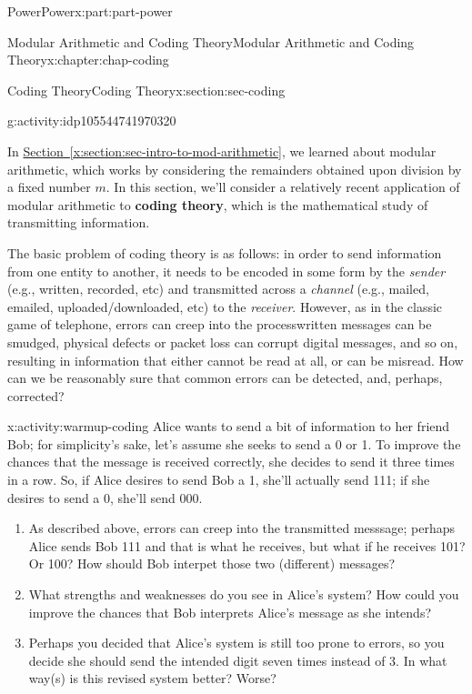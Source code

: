 \documentclass[oneside,10pt,]{book}
\newcommand{\xreffont}{\relax}
\newcommand{\terminology}[1]{\textbf{#1}}
\numberwithin{equation}{section}
\begin{document}
\begin{partptx}{Power}{}{Power}{}{}{x:part:part-power}
\begin{chapterptx}{Modular Arithmetic and Coding Theory}{}{Modular Arithmetic and Coding Theory}{}{}{x:chapter:chap-coding}
\begin{sectionptx}{Coding Theory}{}{Coding Theory}{}{}{x:section:sec-coding}
\begin{activity}{}{g:activity:idp105544741970320}
\end{activity}%
In \hyperref[x:section:sec-intro-to-mod-arithmetic]{Section~{\xreffont\ref{x:section:sec-intro-to-mod-arithmetic}}}, we learned about modular arithmetic, which works by considering the remainders obtained upon division by a fixed number \(m\). In this section, we'll consider a relatively recent application of modular arithmetic to \terminology{coding theory}, which is the mathematical study of transmitting information.%
\par
The basic problem of coding theory is as follows: in order to send information from one entity to another, it needs to be encoded in some form by the \emph{sender} (e.g., written, recorded, etc) and transmitted across a \emph{channel} (e.g., mailed, emailed, uploaded\slash{}downloaded, etc) to the \emph{receiver}. However, as in the classic game of telephone, errors can creep into the process\textemdash{}written messages can be smudged, physical defects or packet loss can corrupt digital messages, and so on, resulting in information that either cannot be read at all, or can be misread. How can we be reasonably sure that common errors can be detected, and, perhaps, corrected?%
\begin{activity}{}{x:activity:warmup-coding}%
Alice wants to send a bit of information to her friend Bob; for simplicity's sake, let's assume she seeks to send a 0 or 1. To improve the chances that the message is received correctly, she decides to send it three times in a row. So, if Alice desires to send Bob a 1, she'll actually send 111; if she desires to send a 0, she'll send 000.%
%
\begin{enumerate}
\item{}As described above, errors can creep into the transmitted messsage; perhaps Alice sends Bob 111 and that is what he receives, but what if he receives 101? Or 100? How should Bob interpet those two (different) messages?%
\item{}What strengths and weaknesses do you see in Alice's system? How could you improve the chances that Bob interprets Alice's message as she intends?%
\item{}Perhaps you decided that Alice's system is still too prone to errors, so you decide she should send the intended digit seven times instead of 3. In what way(s) is this revised system better? Worse?%
\end{enumerate}
\end{activity}%

\end{sectionptx}
\end{chapterptx}
\end{partptx}
\end{document}
